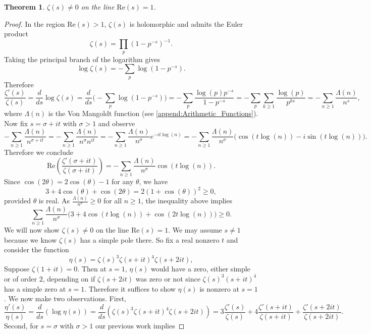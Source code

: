 \documentclass[12pt]{book}
\newtheorem{theorem}{Theorem}[section]
\theoremstyle{definition}\newframedtheorem{method}{Method}
\newcommand{\z}{\zeta}
\renewcommand{\t}{\theta}
\newcommand{\s}{\sigma}
\renewcommand{\L}{\Lambda}
\newcommand{\<}{\langle}
\renewcommand{\>}{\rangle}
\renewcommand{\Re}{\mathrm{Re}}
\begin{document}
      \begin{theorem}\label{thm:nonvanishing_of_zeta_on_Re(s)=1}
        $\z(s) \neq 0$ on the line $\Re(s) = 1$.
      \end{theorem}
      \begin{proof}
        In the region $\Re(s) > 1$, $\z(s)$ is holomorphic and admits the Euler product
        \[
          \z(s) = \prod_{p}(1-p^{-s})^{-1}.
        \]
        Taking the principal branch of the logarithm gives
        \[
          \log\z(s) = -\sum_{p}\log(1-p^{-s}).
        \]
        Therefore
        \[
          \frac{\z'(s)}{\z(s)} = \frac{d}{ds}\log\z(s) = \frac{d}{ds}\bigg(-\sum_{p}\log(1-p^{-s})\bigg) = -\sum_{p}\frac{\log(p)p^{-s}}{1-p^{-s}} = -\sum_{p}\sum_{k \ge 1}\frac{\log(p)}{p^{ks}} = -\sum_{n \ge 1}\frac{\L(n)}{n^{s}},
        \]
        where $\L(n)$ is the Von Mangoldt function (see \cref{append:Arithmetic_Functions}). Now fix $s = \s+it$ with $\s > 1$ and observe
        \[
          -\sum_{n \ge 1}\frac{\L(n)}{n^{\s+it}} = -\sum_{n \ge 1}\frac{\L(n)}{n^{\s}n^{it}} = -\sum_{n \ge 1}\frac{\L(n)}{n^{\s}}e^{-it\log(n)} = -\sum_{n \ge 1}\frac{\L(n)}{n^{\s}}\bigg(\cos(t\log(n))-i\sin(t\log(n))\bigg).
        \]
        Therefore we conclude
        \[
          \Re\left(\frac{\z'(\s+it)}{\z(\s+it)}\right) = -\sum_{n \ge 1}\frac{\L(n)}{n^{\s}}\cos(t\log(n)).
        \]
        Since $\cos(2\t) = 2\cos(\t)-1$ for any $\t$, we have
        \[
          3+4\cos(\t)+\cos(2\t) = 2(1+\cos(\t))^{2} \ge 0,
        \]
        provided $\t$ is real. As $\frac{\L(n)}{n^{\s}} \ge 0$ for all $n \ge 1$, the inequality above implies
        \[
          \sum_{n \ge 1}\frac{\L(n)}{n^{\s}}\bigg(3+4\cos(t\log(n))+\cos(2t\log(n))\bigg) \ge 0.
        \]
        We will now show $\z(s) \neq 0$ on the line $\Re(s) = 1$. We may assume $s \neq 1$ because we know $\z(s)$ has a simple pole there. So fix a real nonzero $t$ and consider the function
        \[
          \eta(s) = \z(s)^{3}\z(s+it)^{4}\z(s+2it),
        \]
        Suppose $\z(1+it) = 0$. Then at $s = 1$, $\eta(s)$ would have a zero, either simple or of order $2$, depending on if $\z(s+2it)$ was zero or not since $\z(s)^{3}(s+it)^{4}$ has a simple zero at $s = 1$. Therefore it suffices to show $\eta(s)$ is nonzero at $s = 1$. We now make two observations. First,
        \[
          \frac{\eta'(s)}{\eta(s)} = \frac{d}{ds}(\log\eta(s)) = \frac{d}{ds}(\z(s)^{3}\z(s+it)^{4}\z(s+2it)) = 3\frac{\z'(s)}{\z(s)}+4\frac{\z'(s+it)}{\z(s+it)}+\frac{\z'(s+2it)}{\z(s+2it)}.
        \]
        Second, for $s = \s$ with $\s > 1$ our previous work implies

\end{proof}
\end{document}
